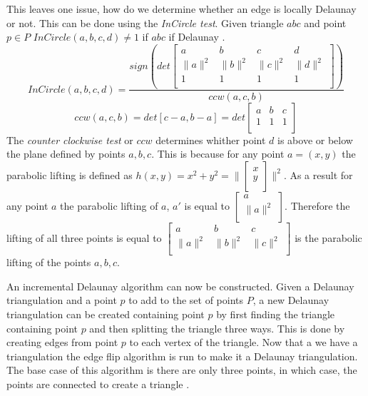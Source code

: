 \documentclass[11pt]{article}
\begin{document}
This leaves one issue, how do we determine whether an edge is locally Delaunay or not. This can be done using the \emph{InCircle test}. Given triangle $abc$ and point $p \in P$ $InCircle(a,b,c,d) \neq 1$ if $abc$ if Delaunay \cite{princeton:CCW}. 
	\begin{equation}
		InCircle(a,b,c,d) = \frac{sign(det
		\begin{bmatrix}
    			a & b & c & d \\
    			\|a\|^2 & \|b\|^2 & \|c\|^2 & \|d\|^2 \\
    			1 & 1 & 1 & 1 \\
		\end{bmatrix} 
		)}{ccw(a,c,b)}
	\end{equation}
	\begin{equation}
		ccw(a,c,b) = det[c-a,b-a] = det
		\begin{bmatrix}
    			a & b & c \\
    			1 & 1 & 1\\
		\end{bmatrix} 
	\end{equation} 
	The \emph{counter clockwise test} or $ccw$ determines whither point $d$ is above or below the plane defined by points $a,b,c$. This is because for any point $a = (x,y)$ the parabolic lifting is defined as $h(x,y) = x^2 + y^2 = \| 
	\begin{bmatrix} 
		x \\
		y \\ 
	\end{bmatrix} 
	\|^2$.
	As a result for any point $a$ the parabolic lifting of $a$, $a'$ is equal to $
	\begin{bmatrix} 
		a \\ 
		\| a \|^2 \\ 
	\end{bmatrix}$. 
	Therefore the lifting of all three points is equal to
	$\begin{bmatrix}
    			a & b & c \\
    			\|a\|^2 & \|b\|^2 & \|c\|^2 \\
	\end{bmatrix}$ 
	is the parabolic lifting of the points $a,b,c$.

An incremental Delaunay algorithm can now be constructed. Given a Delaunay triangulation and a point $p$ to add to the set of points $P$, a new Delaunay triangulation can be created containing point $p$ by first finding the triangle containing point $p$ and then splitting the triangle three ways. This is done by creating edges from point $p$ to each vertex of the triangle. Now that a we have a triangulation the edge flip algorithm is run to make it a Delaunay triangulation. The base case of this algorithm is there are only three points, in which case, the points are connected to create a triangle \cite{meshGeneration}. 
\end{document}
